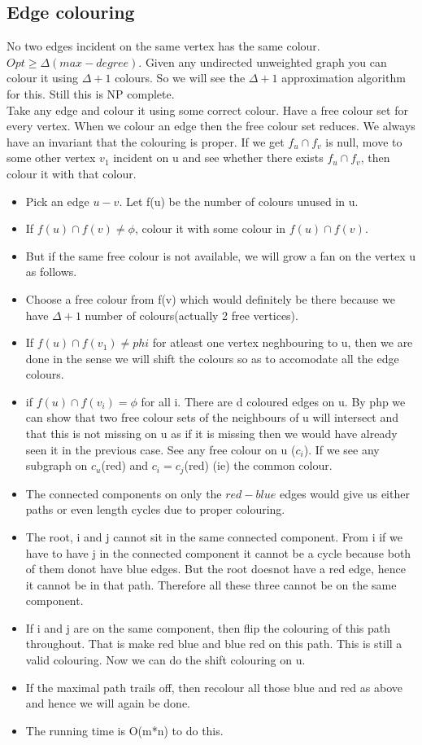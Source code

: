 \documentclass[solution,addpoints,12pt]{exam}
\begin{document}
\subsection{Edge colouring}
No two edges incident on the same vertex has the same colour.
$Opt \ge \Delta(max-degree)$. Given any undirected
unweighted graph you can colour it using $\Delta + 1$
colours. So we will see the $\Delta + 1$ approximation
algorithm for this. Still this is NP complete.\\
Take any edge and colour it using some correct
colour. Have a free colour set for every vertex.
When we colour an edge then the free colour set reduces.
We always have an invariant that the colouring is proper.
If we get $f_u \cap f_v$ is null, move to some
other vertex $v_1$ incident on u and see whether
there exists $f_u \cap f_v$, then colour it with that
colour.
\begin{itemize}
\item Pick an edge $u-v$. Let f(u) be the number of colours
unused in u.
\item If $f(u) \cap f(v) \ne \phi$, colour it
with some colour in $f(u) \cap f(v)$.\\
\item But if the same free colour is not available,
we will grow a fan on the vertex u as follows.
\item Choose a free colour from f(v) which would definitely be there
because we have $\Delta + 1$ number of colours(actually 2 free vertices).
\item If $f(u) \cap f(v_1) \ne phi$ for atleast one vertex neghbouring
to u, then we are done in the sense we will shift the colours
so as to accomodate all the edge colours.
\item if $f(u) \cap f(v_i) = \phi$ for all i.
There are d coloured edges on u. By php
we can show that two free colour sets of the neighbours
of u will intersect and that this is not missing on u
as if it is missing then we would have already
seen it in the previous case. See any free colour
on u ($c_i$). If we see any subgraph on $c_u$(red) and $c_i = c_j$(red)
(ie) the common colour.
\item The connected components on only the $red-blue$ edges
would give us either paths or even length cycles due to proper
colouring.
\item The root, i and j cannot sit in the same connected
component. From i if we have to have j in the connected component
it cannot be a cycle because both of them donot
have blue edges. But the root doesnot have a red edge, hence it cannot
be in that path. Therefore all these three cannot be on the same
component.
\item If i and j are on the same component, then flip
the colouring of this path throughout. That is make
red blue and blue red on this path. This is still a valid colouring.
Now we can do the shift colouring on u.
\item If the maximal path trails off, then recolour all those blue and
red as above and hence we will again be done.
\item The running time is O(m*n) to do this.
\end{itemize}
\end{document}
